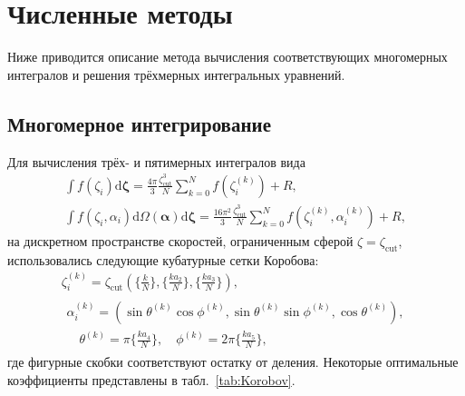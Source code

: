 \documentclass[a4paper,12pt]{article}
\newcommand{\dd}{\mathrm{d}}
\newcommand{\dzeta}{\boldsymbol{\dd\zeta}}
\begin{document}
\section{Численные методы}

Ниже приводится описание метода вычисления соответствующих многомерных интегралов
и решения трёхмерных интегральных уравнений.

\subsection{Многомерное интегрирование}\label{sec:Korobov}

Для вычисления трёх- и пятимерных интегралов вида
\begin{gather}
    \int f(\zeta_i) \dzeta = \frac{4\pi}{3}\frac{\zeta_\mathrm{cut}^3}{N}
        \sum_{k=0}^N f(\zeta_i^{(k)}) + R, \label{eq:dicrete_L}\\
    \int f(\zeta_i,\alpha_i) \dd\Omega(\boldsymbol{\alpha})\dzeta = \frac{16\pi^2}{3}\frac{\zeta_\mathrm{cut}^3}{N}
        \sum_{k=0}^N f(\zeta_i^{(k)},\alpha_i^{(k)}) + R, \label{eq:dicrete_J}
\end{gather}
на дискретном пространстве скоростей, ограниченным сферой \(\zeta = \zeta_\mathrm{cut}\),
использовались следующие кубатурные сетки Коробова:
\begin{gather}
    \zeta_i^{(k)} = \zeta_\mathrm{cut}\left( \Big\{\frac{k}{N}\Big\}, \Big\{\frac{k a_2}{N}\Big\}, \Big\{\frac{k a_3}N\Big\} \right), \\
    \begin{split}
    \alpha_i^{(k)} = \left( \sin\theta^{(k)}\cos\phi^{(k)}, \sin\theta^{(k)}\sin\phi^{(k)}, \cos\theta^{(k)} \right), \\
    \quad \theta^{(k)} =  \pi\Big\{\frac{k a_4}{N}\Big\},
    \quad \phi^{(k)}   = 2\pi\Big\{\frac{k a_5}{N}\Big\},
    \end{split}
\end{gather}
где фигурные скобки соответствуют остатку от деления.
Некоторые оптимальные коэффициенты представлены в табл.~\ref{tab:Korobov}.
\end{document}
